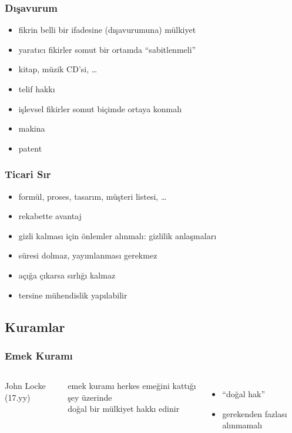 \documentclass[dvipsnames]{beamer}
\theoremstyle{definition}
\theoremstyle{example}
\theoremstyle{plain}
\begin{document}
\begin{frame}
  \frametitle{Dışavurum}

  \begin{itemize}
    \item fikrin belli bir \alert{ifade}sine (dışavurumuna) mülkiyet

    \medskip
    \item yaratıcı fikirler somut bir ortamda ``sabitlenmeli''
    \item kitap, müzik CD'si, \ldots
    \item \alert{telif hakkı}

    \pause
    \medskip
    \item işlevsel fikirler somut biçimde ortaya konmalı
    \item makina
    \item \alert{patent}
  \end{itemize}
\end{frame}

\begin{frame}
  \frametitle{Ticari Sır}

  \begin{itemize}
    \item formül, proses, tasarım, müşteri listesi, \ldots
    \item rekabette avantaj
    \item gizli kalması için önlemler alınmalı: gizlilik anlaşmaları

    \pause
    \medskip
    \item süresi dolmaz, yayımlanması gerekmez
    \item açığa çıkarsa sırlığı kalmaz

    \medskip
    \item \alert{tersine mühendislik} yapılabilir
  \end{itemize}
\end{frame}

\subsection{Kuramlar}

\begin{frame}
  \frametitle{Emek Kuramı}

  \begin{columns}
    \begin{center}

      John Locke (17.yy)
    \end{center}

    \begin{block}{emek kuramı}
        herkes emeğini kattığı şey üzerinde\\
        doğal bir mülkiyet hakkı edinir
    \end{block}
    \begin{itemize}
      \item ``doğal hak''
      \item gerekenden fazlası alınmamalı
    \end{itemize}
  \end{columns}
\end{frame}
\end{document}
